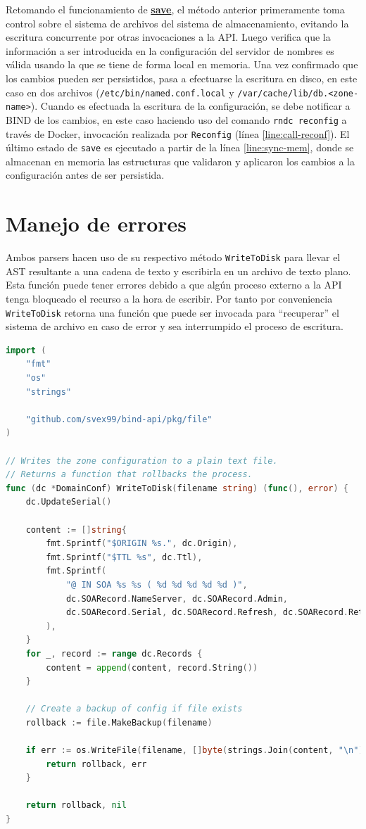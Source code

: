 Retomando el funcionamiento de \hyperref[proc:save]{\textbf{save}}, el método anterior primeramente toma control sobre el sistema de archivos del sistema de almacenamiento, evitando la escritura concurrente por otras invocaciones a la API. Luego verifica que la información a ser introducida en la configuración del servidor de nombres es válida usando la que se tiene de forma local en memoria. Una vez confirmado que los cambios pueden ser persistidos, pasa a efectuarse la escritura en disco, en este caso en dos archivos (\verb|/etc/bin/named.conf.local| y \verb|/var/cache/lib/db.<zone-name>|). Cuando es efectuada la escritura de la configuración, se debe notificar a BIND de los cambios, en este caso haciendo uso del comando \verb|rndc reconfig| a través de Docker, invocación realizada por \verb|Reconfig| (línea \ref{line:call-reconf}). El último estado de \verb|save| es ejecutado a partir de la línea \ref{line:sync-mem}, donde se almacenan en memoria las estructuras que validaron y aplicaron los cambios a la configuración antes de ser persistida.

\section{Manejo de errores}

Ambos parsers hacen uso de su respectivo método \verb|WriteToDisk| para llevar el AST resultante a una cadena de texto y escribirla en un archivo de texto plano. Esta función puede tener errores debido a que algún proceso externo a la API tenga bloqueado el recurso a la hora de escribir. Por tanto por conveniencia \verb|WriteToDisk| retorna una función que puede ser invocada para ``recuperar'' el sistema de archivo en caso de error y sea interrumpido el proceso de escritura.

\begin{lstlisting}[frame=single, language=Go, caption=Implementación de \textbf{WriteToDisk} para el AST de una zona.]
import (
    "fmt"
    "os"
    "strings"

    "github.com/svex99/bind-api/pkg/file"
)

// Writes the zone configuration to a plain text file.
// Returns a function that rollbacks the process.
func (dc *DomainConf) WriteToDisk(filename string) (func(), error) {
    dc.UpdateSerial()

    content := []string{
        fmt.Sprintf("$ORIGIN %s.", dc.Origin),
        fmt.Sprintf("$TTL %s", dc.Ttl),
        fmt.Sprintf(
            "@ IN SOA %s %s ( %d %d %d %d %d )",
            dc.SOARecord.NameServer, dc.SOARecord.Admin,
            dc.SOARecord.Serial, dc.SOARecord.Refresh, dc.SOARecord.Retry, dc.SOARecord.Expire, dc.SOARecord.Minimum,
        ),
    }
    for _, record := range dc.Records {
        content = append(content, record.String())
    }

    // Create a backup of config if file exists
    rollback := file.MakeBackup(filename)

    if err := os.WriteFile(filename, []byte(strings.Join(content, "\n")), 0666); err != nil {
        return rollback, err
    }

    return rollback, nil
}
\end{lstlisting}

